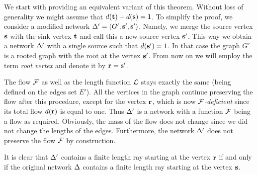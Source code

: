 \documentclass[12pt,oneside,a4paper]{amsart}
\begin{document}
    We start with providing an equivalent variant of this theorem.
      Without loss of generality we might assume that $d(\mathbf{t}) + d(\mathbf{s}) = 1$.
      To simplify the proof, we consider a modified network $\Delta' = (G', \mathbf{s}', \mathbf{s}')$.
      Namely, we merge the source vertex $\mathbf{s}$ with the sink vertex $\mathbf{t}$ and call this a new source vertex $\mathbf{s}'$.
      This way we obtain a network $\Delta'$ with a single source such that $d(\mathbf{s}') = 1$.
      In that case the graph $G'$ is a rooted graph with the root at the vertex $\mathbf{s}'$.
      From now on we will employ the term \emph{root vertex} and denote it by $\mathbf{r} = \mathbf{s}'$.

      The flow $\mathcal{F}$ as well as the length function $\mathcal{L}$ stays exactly the same (being defined on the edges set $E'$).
      All the vertices in the graph continue preserving the flow after this procedure, except for the vertex $\mathbf{r}$,
        which is now \emph{$\mathcal{F}$-deficient} since its total flow $d(\mathbf{r})$ is equal to one.
      Thus $\Delta'$ is a network with a function $\mathcal{F}$ being a flow as required.
      Obviously, the mass of the flow does not change since we did not change the lengths of the edges.
      Furthermore, the network $\Delta'$ does not preserve the flow $\mathcal{F}$ by construction.

      It is clear that $\Delta'$ contains a finite length ray starting at the vertex $\mathbf{r}$ if and only if the original network $\Delta$ contains a finite length ray starting at the vertex $\mathbf{s}$.
\end{document}
